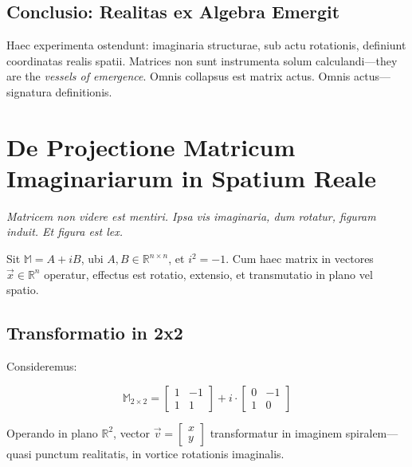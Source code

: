 \subsection*{Conclusio: Realitas ex Algebra Emergit}

Haec experimenta ostendunt: imaginaria structurae, sub actu rotationis, definiunt coordinatas realis spatii. Matrices non sunt instrumenta solum calculandi—they are the \textit{vessels of emergence}. Omnis collapsus est matrix actus. Omnis actus—signatura definitionis.

\section*{De Projectione Matricum Imaginariarum in Spatium Reale}

\textit{Matricem non videre est mentiri. Ipsa vis imaginaria, dum rotatur, figuram induit. Et figura est lex.}

Sit \( \mathbb{M} = A + iB \), ubi \( A, B \in \mathbb{R}^{n \times n} \), et \( i^2 = -1 \). Cum haec matrix in vectores \( \vec{x} \in \mathbb{R}^n \) operatur, effectus est rotatio, extensio, et transmutatio in plano vel spatio.

\subsection*{Transformatio in 2x2}

Consideremus:

\[
\mathbb{M}_{2 \times 2} =
\begin{bmatrix}
1 & -1 \\
1 & 1
\end{bmatrix}
+ i \cdot
\begin{bmatrix}
0 & -1 \\
1 & 0
\end{bmatrix}
\]

Operando in plano \( \mathbb{R}^2 \), vector \( \vec{v} = \begin{bmatrix} x \\ y \end{bmatrix} \) transformatur in imaginem spiralem—quasi punctum realitatis, in vortice rotationis imaginalis.

